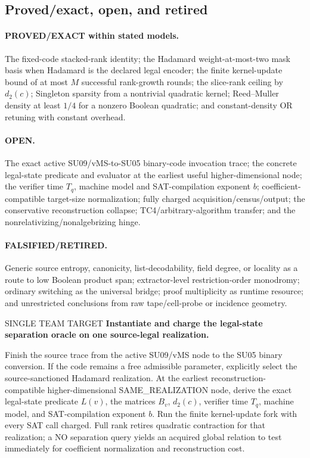 \documentclass[11pt]{article}
\begin{document}
\subsection{Proved/exact, open, and retired}

\paragraph{PROVED/EXACT within stated models.}
The fixed-code stacked-rank identity; the Hadamard weight-at-most-two mask
basis when Hadamard is the declared legal encoder; the finite
kernel-update bound of at most \(M\) successful rank-growth rounds; the
slice-rank ceiling by \(d_2(c)\); Singleton sparsity from a nontrivial
quadratic kernel; Reed--Muller density at least \(1/4\) for a nonzero
Boolean quadratic; and constant-density OR retuning with constant overhead.

\paragraph{OPEN.}
The exact active SU09/vMS-to-SU05 binary-code invocation trace; the concrete
legal-state predicate and evaluator at the earliest useful
higher-dimensional node; the verifier time \(T_q\), machine model and
SAT-compilation exponent \(b\); coefficient-compatible target-size
normalization; fully charged acquisition/census/output; the conservative
reconstruction collapse; TC4/arbitrary-algorithm transfer; and the
nonrelativizing/nonalgebrizing hinge.

\paragraph{FALSIFIED/RETIRED.}
Generic source entropy, canonicity, list-decodability, field degree, or
locality as a route to low Boolean product span; extractor-level
restriction-order monodromy; ordinary switching as the universal bridge;
proof multiplicity as runtime resource; and unrestricted conclusions from
raw tape/cell-probe or incidence geometry.

\begin{candidatebox}{SINGLE TEAM TARGET}
\textbf{Instantiate and charge the legal-state separation oracle on one
source-legal realization.}

Finish the source trace from the active SU09/vMS node to the SU05 binary
conversion.  If the code remains a free admissible parameter, explicitly
select the source-sanctioned Hadamard realization.  At the earliest
reconstruction-compatible higher-dimensional SAME\_REALIZATION node,
derive the exact legal-state predicate \(L(v)\), the matrices \(B_v\),
\(d_2(c)\), verifier time \(T_q\), machine model, and SAT-compilation
exponent \(b\).  Run the finite kernel-update fork with every SAT call
charged.  Full rank retires quadratic contraction for that realization;
a NO separation query yields an acquired global relation to test
immediately for coefficient normalization and reconstruction cost.
\end{candidatebox}
\end{document}
